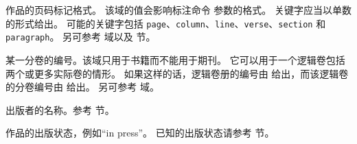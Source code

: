 \begin{fieldlist}


作品的页码标记格式。
该域的值会影响标注命令  参数的格式。
关键字应当以单数的形式给出。
可能的关键字包括 \texttt{page}、\texttt{column}、\texttt{line}、\texttt{verse}、\texttt{section} 和 \texttt{paragraph}。
另可参考  域以及  节。




某一分卷的编号。该域只用于书籍而不能用于期刊。
它可以用于一个逻辑卷包括两个或更多实际卷的情形。
如果这样的话，逻辑卷册的编号由  给出，而该逻辑卷的分卷编号由  给出。
另可参考  域。




出版者的名称。参考  节。




作品的出版状态，例如“in press”。
已知的出版状态请参考   节。




\end{fieldlist}
